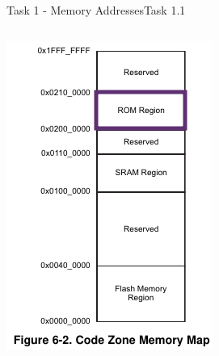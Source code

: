 {\begin{frame}[allowframebreaks]{Task 1 - Memory Addresses}{Task 1.1\vspace{0.25cm}}
\begin{solution}
\begin{columns}
\begin{column}{0.3\paperwidth}
        \includegraphics[height=0.4\paperheight]{./figures/rom.png}


\end{column}
\end{columns}
\end{solution}
\end{frame}}
